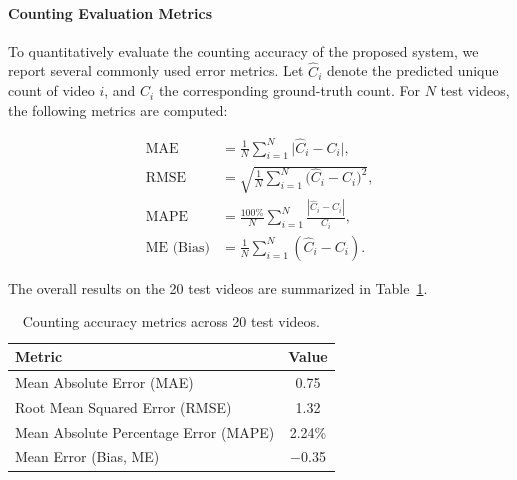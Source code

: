 \paragraph{Counting Evaluation Metrics}

To quantitatively evaluate the counting accuracy of the proposed system, we report several commonly used error metrics. 
Let $\hat{C}_i$ denote the predicted unique count of video $i$, and $C_i$ the corresponding ground-truth count. 
For $N$ test videos, the following metrics are computed:

\begin{align}
\text{MAE} &= \frac{1}{N} \sum_{i=1}^{N} \big| \hat{C}_i - C_i \big|, \\
\text{RMSE} &= \sqrt{\frac{1}{N} \sum_{i=1}^{N} \big(\hat{C}_i - C_i \big)^2}, \\
\text{MAPE} &= \frac{100\%}{N} \sum_{i=1}^{N} \frac{|\hat{C}_i - C_i|}{C_i}, \\
\text{ME (Bias)} &= \frac{1}{N} \sum_{i=1}^{N} (\hat{C}_i - C_i).
\end{align}

\noindent The overall results on the 20 test videos are summarized in Table~\ref{tab:count_metrics}.

\begin{table}[h!]
\centering
\caption{Counting accuracy metrics across 20 test videos.}
\label{tab:count_metrics}
\begin{tabular}{l c}
\toprule
Metric & Value \\
\midrule
Mean Absolute Error (MAE) & \num{0.75} \\
Root Mean Squared Error (RMSE) & \num{1.32} \\
Mean Absolute Percentage Error (MAPE) & \num{2.24}\% \\
Mean Error (Bias, ME) & \num{-0.35} \\
\bottomrule
\end{tabular}
\end{table}

\fi